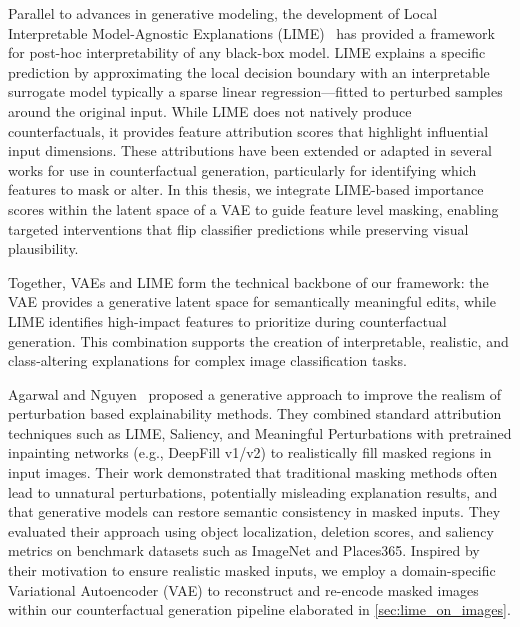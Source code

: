 Parallel to advances in generative modeling, the development of Local Interpretable Model-Agnostic Explanations (LIME)~\cite{Ribeiro2018} has provided a framework for post-hoc interpretability of any black-box model. LIME explains a specific prediction by approximating the local decision boundary with an interpretable surrogate model typically a sparse linear regression—fitted to perturbed samples around the original input. While LIME does not natively produce counterfactuals, it provides feature attribution scores that highlight influential input dimensions. These attributions have been extended or adapted in several works for use in counterfactual generation, particularly for identifying which features to mask or alter. In this thesis, we integrate LIME-based importance scores within the latent space of a VAE to guide feature level masking, enabling targeted interventions that flip classifier predictions while preserving visual plausibility.

Together, VAEs and LIME form the technical backbone of our framework: the VAE provides a generative latent space for semantically meaningful edits, while LIME identifies high-impact features to prioritize during counterfactual generation. This combination supports the creation of interpretable, realistic, and class-altering explanations for complex image classification tasks.

Agarwal and Nguyen~\cite{agarwal2020explainingimageclassifiersremoving} proposed a generative approach to improve the realism of perturbation based explainability methods. They combined standard attribution techniques such as LIME, Saliency, and Meaningful Perturbations with pretrained inpainting networks (e.g., DeepFill v1/v2) to realistically fill masked regions in input images. Their work demonstrated that traditional masking methods often lead to unnatural perturbations, potentially misleading explanation results, and that generative models can restore semantic consistency in masked inputs. They evaluated their approach using object localization, deletion scores, and saliency metrics on benchmark datasets such as ImageNet and Places365. Inspired by their motivation to ensure realistic masked inputs, we employ a domain-specific Variational Autoencoder (VAE) to reconstruct and re-encode masked images within our counterfactual generation pipeline elaborated in \cref{sec:lime_on_images}.







